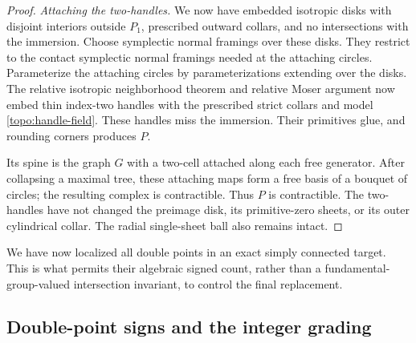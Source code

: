 \documentclass[11pt]{article}
\numberwithin{equation}{section}
\theoremstyle{definition}
\theoremstyle{remark}
\begin{document}
\begin{proof}
\emph{Attaching the two-handles.}
We now have embedded isotropic disks with disjoint interiors outside
$P_1$, prescribed outward collars, and no intersections with the
immersion.  Choose symplectic normal framings over these disks.  They
restrict to the contact symplectic normal framings needed at the attaching
circles.  Parameterize the attaching circles by parameterizations
extending over the disks.  The relative isotropic neighborhood
theorem and relative Moser argument now embed thin index-two
handles with the prescribed strict collars and model
\eqref{topo:handle-field}.  These handles miss the immersion.
Their primitives glue, and rounding corners produces $P$.

Its spine is the graph $G$ with a two-cell attached along each
free generator.  After collapsing a maximal tree, these attaching
maps form a free basis of a bouquet of circles; the resulting
complex is contractible.  Thus $P$ is contractible.  The two-handles
have not changed the preimage disk, its primitive-zero sheets,
or its outer cylindrical collar.  The radial single-sheet ball
also remains intact.
\end{proof}

We have now localized all double points in an exact simply connected
target.  This is what permits their algebraic signed count, rather
than a fundamental-group-valued intersection invariant, to control
the final replacement.

\subsection{Double-point signs and the integer grading}
\end{document}
